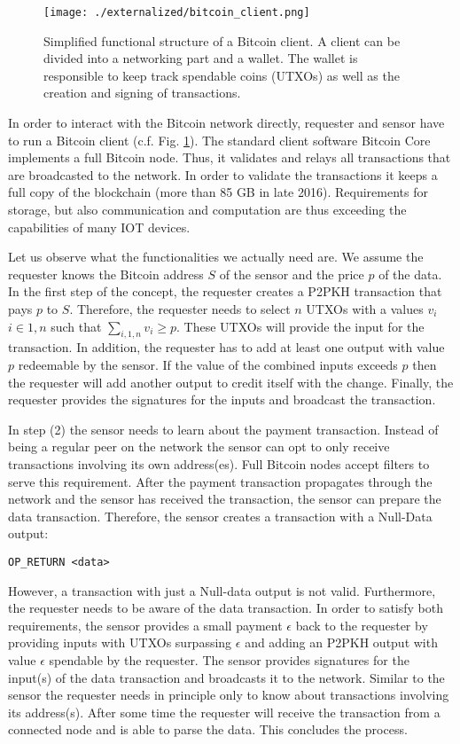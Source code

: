 \begin{figure}
\centering
\texttt{[image: ./externalized/bitcoin\_client.png]}
\caption{Simplified functional structure of a Bitcoin client. A client can be divided into a networking part and a wallet. The wallet is responsible to keep track spendable coins (\ac{UTXO}s) as well as the creation and signing of transactions.}
\label{fig:btcClient}
\end{figure}


In order to interact with the Bitcoin network directly, requester and sensor have to run a Bitcoin client (c.f. Fig. \ref{fig:btcClient}). The standard client software Bitcoin Core implements a full Bitcoin node. Thus, it validates and relays all transactions that are broadcasted to the network. In order to validate the transactions it keeps a full copy of the blockchain (more than 85 GB in late 2016). Requirements for storage, but also communication and computation are thus exceeding the capabilities of many \ac{IOT} devices.

Let us observe what the functionalities we actually need are. We assume the requester knows the Bitcoin address $S$ of the sensor and the price $p$ of the data. In the first step of the concept, the requester creates a \ac{P2PKH} transaction that pays $p$ to $S$. Therefore, the requester needs to select $n$ \ac{UTXO}s with a values $v_i$ $i \in {1,n}$ such that $\sum_{i,1,n}v_i\ge p$. These \ac{UTXO}s will provide the input for the transaction. In addition, the requester has to add at least one output with value $p$ redeemable by the sensor. If the value of the combined inputs exceeds $p$ then the requester will add another output to credit itself with the change. Finally, the requester provides the signatures for the inputs and broadcast the transaction.

In step (2) the sensor needs to learn about the payment transaction. Instead of being a regular peer on the network the sensor can opt to only receive transactions involving its own address(es). Full Bitcoin nodes accept filters to serve this requirement. After the payment transaction propagates through the network and the sensor has received the transaction, the sensor can prepare the data transaction. Therefore, the sensor creates a transaction with a Null-Data output:

\begin{lstlisting}
OP_RETURN <data>
\end{lstlisting}

However, a transaction with just a Null-data output is not valid. Furthermore, the requester needs to be aware of the data transaction. In order to satisfy both requirements, the sensor provides a small payment $\epsilon$ back to the requester by providing inputs with \ac{UTXO}s surpassing $\epsilon$ and adding an \ac{P2PKH} output with value $\epsilon$ spendable by the requester. The sensor provides signatures for the input(s) of the data transaction and broadcasts it to the network. Similar to the sensor the requester needs in principle only to know about transactions involving its address(s). After some time the requester will receive the transaction from a connected node and is able to parse the data. This concludes the process. 

